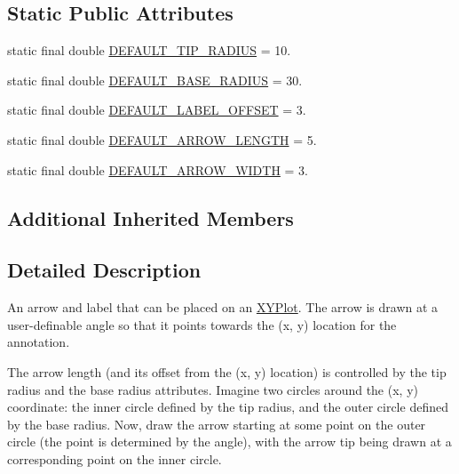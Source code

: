 \subsection*{Static Public Attributes}
\begin{DoxyCompactItemize}
\item 
static final double \mbox{\hyperlink{classorg_1_1jfree_1_1chart_1_1annotations_1_1_x_y_pointer_annotation_af8c70dbfc15c06713f5d28b9c8fdbc75}{D\+E\+F\+A\+U\+L\+T\+\_\+\+T\+I\+P\+\_\+\+R\+A\+D\+I\+US}} = 10.
\item 
static final double \mbox{\hyperlink{classorg_1_1jfree_1_1chart_1_1annotations_1_1_x_y_pointer_annotation_a7b7ff23487a3f821138020ca501f5943}{D\+E\+F\+A\+U\+L\+T\+\_\+\+B\+A\+S\+E\+\_\+\+R\+A\+D\+I\+US}} = 30.
\item 
static final double \mbox{\hyperlink{classorg_1_1jfree_1_1chart_1_1annotations_1_1_x_y_pointer_annotation_a37477e155a06c5576e66d48e3f8afb1f}{D\+E\+F\+A\+U\+L\+T\+\_\+\+L\+A\+B\+E\+L\+\_\+\+O\+F\+F\+S\+ET}} = 3.
\item 
static final double \mbox{\hyperlink{classorg_1_1jfree_1_1chart_1_1annotations_1_1_x_y_pointer_annotation_a31e319b723b99d78aa2763b5bac52b62}{D\+E\+F\+A\+U\+L\+T\+\_\+\+A\+R\+R\+O\+W\+\_\+\+L\+E\+N\+G\+TH}} = 5.
\item 
static final double \mbox{\hyperlink{classorg_1_1jfree_1_1chart_1_1annotations_1_1_x_y_pointer_annotation_a5e3e45a848c401bfe278d885db0a6676}{D\+E\+F\+A\+U\+L\+T\+\_\+\+A\+R\+R\+O\+W\+\_\+\+W\+I\+D\+TH}} = 3.
\end{DoxyCompactItemize}
\subsection*{Additional Inherited Members}


\subsection{Detailed Description}
An arrow and label that can be placed on an \mbox{\hyperlink{}{X\+Y\+Plot}}. The arrow is drawn at a user-\/definable angle so that it points towards the (x, y) location for the annotation. 

The arrow length (and its offset from the (x, y) location) is controlled by the tip radius and the base radius attributes. Imagine two circles around the (x, y) coordinate\+: the inner circle defined by the tip radius, and the outer circle defined by the base radius. Now, draw the arrow starting at some point on the outer circle (the point is determined by the angle), with the arrow tip being drawn at a corresponding point on the inner circle. 

